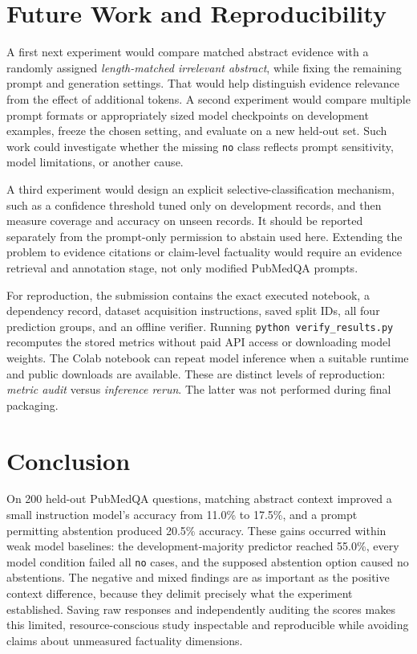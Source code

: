 \documentclass[conference]{IEEEtran}
\begin{document}
\section{Future Work and Reproducibility}
A first next experiment would compare matched abstract evidence with a randomly assigned \emph{length-matched irrelevant abstract}, while fixing the remaining prompt and generation settings. That would help distinguish evidence relevance from the effect of additional tokens. A second experiment would compare multiple prompt formats or appropriately sized model checkpoints on development examples, freeze the chosen setting, and evaluate on a new held-out set. Such work could investigate whether the missing \texttt{no} class reflects prompt sensitivity, model limitations, or another cause.

A third experiment would design an explicit selective-classification mechanism, such as a confidence threshold tuned only on development records, and then measure coverage and accuracy on unseen records. It should be reported separately from the prompt-only permission to abstain used here. Extending the problem to evidence citations or claim-level factuality would require an evidence retrieval and annotation stage, not only modified PubMedQA prompts.

For reproduction, the submission contains the exact executed notebook, a dependency record, dataset acquisition instructions, saved split IDs, all four prediction groups, and an offline verifier. Running \texttt{python verify\_results.py} recomputes the stored metrics without paid API access or downloading model weights. The Colab notebook can repeat model inference when a suitable runtime and public downloads are available. These are distinct levels of reproduction: \emph{metric audit} versus \emph{inference rerun}. The latter was not performed during final packaging.

\section{Conclusion}
On 200 held-out PubMedQA questions, matching abstract context improved a small instruction model's accuracy from 11.0\% to 17.5\%, and a prompt permitting abstention produced 20.5\% accuracy. These gains occurred within weak model baselines: the development-majority predictor reached 55.0\%, every model condition failed all \texttt{no} cases, and the supposed abstention option caused no abstentions. The negative and mixed findings are as important as the positive context difference, because they delimit precisely what the experiment established. Saving raw responses and independently auditing the scores makes this limited, resource-conscious study inspectable and reproducible while avoiding claims about unmeasured factuality dimensions.
\end{document}
